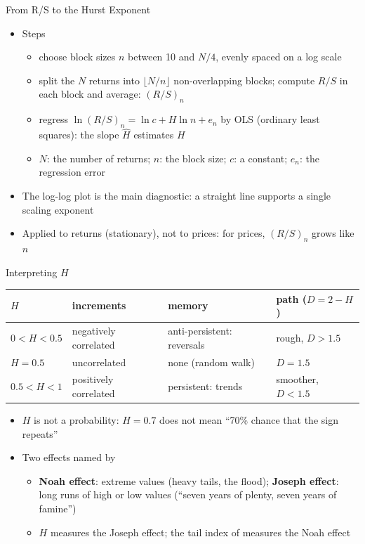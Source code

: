 \begin{frame}{From R/S to the Hurst Exponent}
\itemsize{\small}
\begin{itemize}
    \item Steps 
    \begin{itemize}
        \item choose block sizes $n$ between 10 and $N/4$, evenly spaced on a log scale
        \item split the $N$ returns into $\lfloor N/n\rfloor$ non-overlapping blocks; compute $R/S$ in each block and average: $(R/S)_n$
        \item regress $\ln (R/S)_n = \ln c + H \ln n + e_n$ by OLS (ordinary least squares): the slope $\hat H$ estimates $H$
        \item $N$: the number of returns; $n$: the block size; $c$: a constant; $e_n$: the regression error
    \end{itemize}
    \item The log-log plot is the main diagnostic: a straight line supports a single scaling exponent
    \item Applied to returns (stationary), not to prices: for prices, $(R/S)_n$ grows like $n$
\end{itemize}
\end{frame}

\begin{frame}{Interpreting $H$}
\itemsize{\small}
\begin{center}
\footnotesize
\begin{tabular}{llll}
\toprule
$H$ & increments & memory & path ($D = 2 - H$) \\
\midrule
$0 < H < 0.5$ & negatively correlated & anti-persistent: reversals & rough, $D > 1.5$ \\
$H = 0.5$ & uncorrelated & none (random walk) & $D = 1.5$ \\
$0.5 < H < 1$ & positively correlated & persistent: trends & smoother, $D < 1.5$ \\
\bottomrule
\end{tabular}
\end{center}
\begin{itemize}
    \item $H$ is not a probability: $H = 0.7$ does not mean ``70\% chance that the sign repeats''
    \item Two effects named by 
    \begin{itemize}
        \item \textbf{Noah effect}: extreme values (heavy tails, the flood); \textbf{Joseph effect}: long runs of high or low values (``seven years of plenty, seven years of famine'')
        \item $H$ measures the Joseph effect; the tail index of  measures the Noah effect
    \end{itemize}
\end{itemize}
\end{frame}

